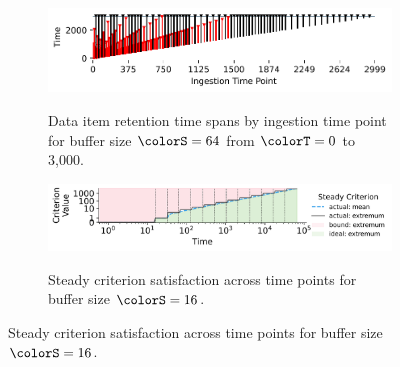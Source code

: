 \begin{figure}[htbp!]
  \vspace{-0.5ex}
   \begin{minipage}[]{\textwidth}
   \vspace{-2pt}
  \begin{subfigure}[t]{0.65\linewidth}
  \vspace{0pt}
    \centering
    \includegraphics[width=0.88\linewidth,clip]{binder/teeplots/12/num-generations=262144+surface-size=64+viz=stratum-persistence-dripplot+ext=.pdf}
  \end{subfigure}%
  \begin{subfigure}[t]{0.35\linewidth}
  \vspace{-2pt}
  \caption{%
    \footnotesize
    Data item retention time spans by ingestion time point for buffer size $\colorS=64$ from $\colorT=0$ to 3,000.
  }
  \label{fig:hsurf-steady-implementation-dripplot}
  \end{subfigure}
  \end{minipage}

  \vspace{-0.5ex}
 \begin{minipage}[]{\textwidth}
 \vspace{-2pt}
\begin{subfigure}[t]{0.65\linewidth}
\vspace{0pt}
  \centering
  \includegraphics[width=0.88\linewidth,clip]{binder/teeplots/12/hue=kind+surface-size=16+viz=criterion-satisfaction-lineplot+x=rank+y=steady-criterion+yscale=symlog+ext=.pdf}
\end{subfigure}%
\begin{subfigure}[t]{0.35\linewidth}
\vspace{-2pt}
\caption{%
  \footnotesize
  Steady criterion satisfaction across time points for buffer size $\colorS=16$.
}
\label{fig:hsurf-steady-implementation-satisfaction}
\end{subfigure}
\end{minipage}


\end{figure}

